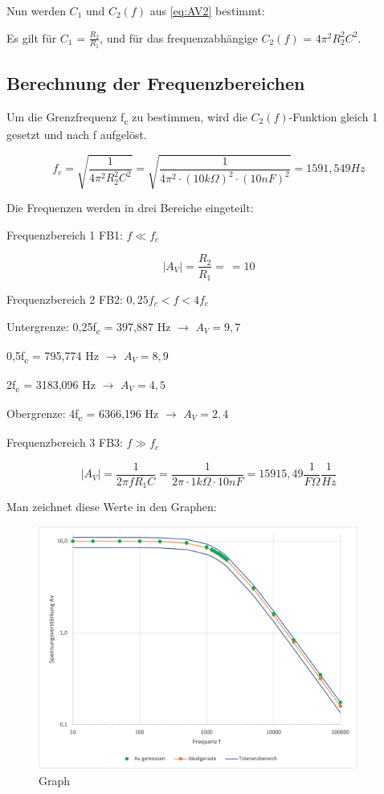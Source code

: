 Nun werden $C_1$ und $C_2(f)$ aus \ref{eq:AV2} bestimmt: \par
Es gilt für $C_1$ = $\frac{R_2}{R_1}$,
 und für das frequenzabhängige $C_2(f)$ = $4 \pi^2 R_2 ^ 2 C^2$.

\subsection{Berechnung der Frequenzbereichen}
Um die Grenzfrequenz f\textsubscript{c} zu bestimmen, wird die
$C_2(f)$-Funktion gleich 1 gesetzt und nach f aufgelöst.

\[
    f_c = \sqrt{\frac{1}{4 \pi^2 R_2^2 C^2}} = \sqrt{\frac{1}{4 \pi^2 \cdot (10k\Omega)^2 \cdot (10nF)^2}} = 1591,549 Hz
\]

Die Frequenzen werden in drei Bereiche eingeteilt: \par

Frequenzbereich 1 FB1: $f \ll f_c$ 

\[
    |A_V| = \frac{R_2}{R_1} = \frac{}{} = 10
\]

Frequenzbereich 2 FB2: $ 0,25f_c < f < 4f_c$ \par
Untergrenze: 0,25f\textsubscript{c} = 397,887 Hz $\rightarrow$ $A_V = 9,7$ \par 
0,5f\textsubscript{c} = 795,774 Hz $\rightarrow$ $A_V = 8,9$ \par
2f\textsubscript{c} = 3183,096 Hz $\rightarrow$ $A_V = 4,5$ \par
Obergrenze: 4f\textsubscript{c} = 6366,196 Hz $\rightarrow$ $A_V = 2,4$ \par

Frequenzbereich 3 FB3: $f \gg f_c$ \par
\[
    |A_V| =\frac{1}{2 \pi f R_1 C} = \frac{1}{2 \pi \cdot 1k\Omega \cdot 10nF} = 15915,49 \frac{1}{F \Omega}\frac{1}{Hz}
\]  

Man zeichnet diese Werte in den Graphen:

\begin{figure}[H]
    \centering
    \includegraphics[height=8cm]{images/Versuch6/Graph_Spannungsverstaerkung.png} 
    \caption{Graph}
    \label{fig: Graph}
\end{figure}

